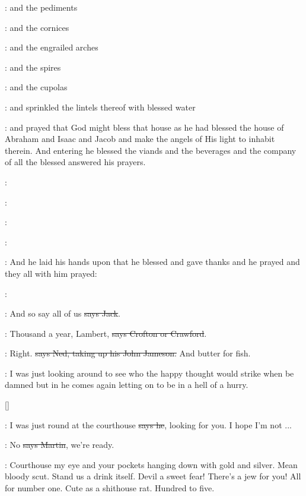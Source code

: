 :
and the pediments 

:
and the cornices 

:
and the engrailed arches 

:
and the spires 

:
and the cupolas 

:
and sprinkled the lintels thereof with blessed water

:
and prayed that God might bless that house as he had
blessed the house of Abraham and Isaac and Jacob and
make the angels of His light to inhabit therein.
And entering he blessed the viands and the beverages and the company of
all the blessed answered his prayers.

:

:

:

:

:
And he laid his hands upon that he blessed and gave thanks and he
prayed and they all with him prayed:

\All:

\power:
And so say all of us \sout{says Jack}.

\crofton:
Thousand a year, Lambert,
\sout{says Crofton or Crawford}.

\lambert:
Right. \sout{says Ned, taking up his John Jameson.}
And butter for fish.

\Nq:
I was just looking around to see who the happy thought would strike
when be damned but in he comes again letting on to be in a hell of a
hurry.

[]

\Bloom:
I was just round at the courthouse \sout{says he},
looking for you. I hope I'm
not ...

\cunningham:
No \sout{says Martin}, we're ready.

\Nq:
Courthouse my eye and your pockets hanging down with gold and silver.
Mean bloody scut. Stand us a drink itself. Devil a sweet fear! There's
a jew for you! All for number one. Cute as a shithouse rat. Hundred to
five.

